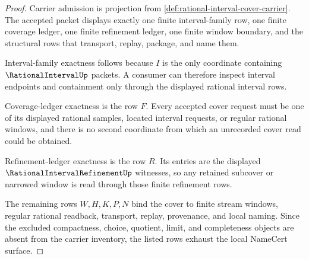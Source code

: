\begin{proof}
Carrier admission is projection from \autoref{def:rational-interval-cover-carrier}. The accepted packet displays exactly one finite interval-family row, one finite coverage ledger, one finite refinement ledger, one finite window boundary, and the structural rows that transport, replay, package, and name them.

Interval-family exactness follows because $I$ is the only coordinate containing $\RationalIntervalUp$ packets. A consumer can therefore inspect interval endpoints and containment only through the displayed rational interval rows.

Coverage-ledger exactness is the row $F$. Every accepted cover request must be one of its displayed rational samples, located interval requests, or regular rational windows, and there is no second coordinate from which an unrecorded cover read could be obtained.

Refinement-ledger exactness is the row $R$. Its entries are the displayed $\RationalIntervalRefinementUp$ witnesses, so any retained subcover or narrowed window is read through those finite refinement rows.

The remaining rows $W,H,K,P,N$ bind the cover to finite stream windows, regular rational readback, transport, replay, provenance, and local naming. Since the excluded compactness, choice, quotient, limit, and completeness objects are absent from the carrier inventory, the listed rows exhaust the local NameCert surface.
\end{proof}

